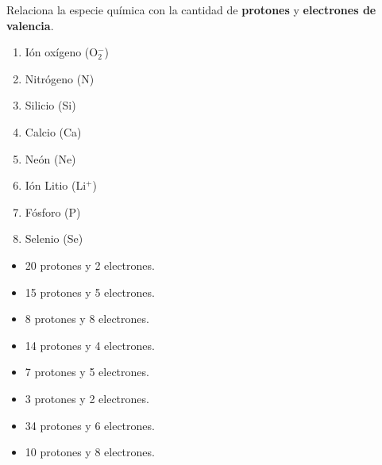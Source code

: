 \begin{boxK}
    Relaciona la especie química con la cantidad de \textbf{protones} y \textbf{electrones de valencia}.\\

    \begin{minipage}{0.5\textwidth}
        \begin{enumerate}
            \item Ión oxígeno (O$_2^-$)
            \item Nitrógeno (N)
            \item Silicio (Si)
            \item Calcio (Ca)
            \item Neón (Ne)
            \item Ión Litio (Li$^+$)
            \item Fósforo (P)
            \item Selenio (Se)
        \end{enumerate}
    \end{minipage}%
    \begin{minipage}{0.5\textwidth}
        \begin{itemize}
            \item[\rule{1cm}{0.2mm}] 20 protones y 2 electrones.
            \item[\rule{1cm}{0.2mm}] 15 protones y 5 electrones.
            \item[\rule{1cm}{0.2mm}] 8 protones y 8 electrones.
            \item[\rule{1cm}{0.2mm}] 14 protones y 4 electrones.
            \item[\rule{1cm}{0.2mm}] 7 protones y 5 electrones.
            \item[\rule{1cm}{0.2mm}] 3 protones y 2 electrones.
            \item[\rule{1cm}{0.2mm}] 34 protones y 6 electrones.
            \item[\rule{1cm}{0.2mm}] 10 protones y 8 electrones.
        \end{itemize}
    \end{minipage}
\end{boxK}
\newpage
